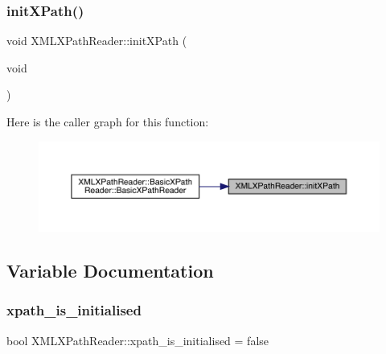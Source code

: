 \subsubsection{\texorpdfstring{initXPath()}{initXPath()}}
{\footnotesize\ttfamily void X\+M\+L\+X\+Path\+Reader\+::init\+X\+Path (\begin{DoxyParamCaption}\item[{void}]{ }\end{DoxyParamCaption})}

Here is the caller graph for this function\+:\nopagebreak
\begin{figure}[H]
\begin{center}
\leavevmode
\includegraphics[width=350pt]{d0/dc5/namespaceXMLXPathReader_a3eaf7514c0fa46eb783802d88bbebb97_icgraph}
\end{center}
\end{figure}


\subsection{Variable Documentation}
\mbox{\label{namespaceXMLXPathReader_a2622cebb93cd752913bf8e9db036f339}} 
\subsubsection{\texorpdfstring{xpath\_is\_initialised}{xpath\_is\_initialised}}
{\footnotesize\ttfamily bool X\+M\+L\+X\+Path\+Reader\+::xpath\+\_\+is\+\_\+initialised = false}

